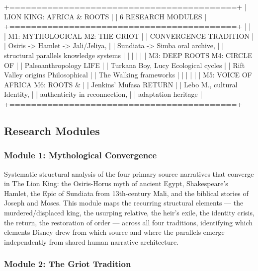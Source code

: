 \documentclass[11pt,letterpaper]{article}
\begin{document}
\begin{asciibox}
  +==========================================+
  |         LION KING: AFRICA & ROOTS        |
  |          6 RESEARCH MODULES              |
  +==========================================+
  |                                          |
  |  M1: MYTHOLOGICAL     M2: THE GRIOT     |
  |      CONVERGENCE          TRADITION      |
  |  Osiris -> Hamlet ->  Jali/Jeliya,       |
  |  Sundiata -> Simba    oral archive,      |
  |  structural parallels knowledge systems  |
  |         |                   |            |
  |  M3: DEEP ROOTS       M4: CIRCLE OF     |
  |  Paleoanthropology        LIFE           |
  |  Turkana Boy, Lucy    Ecological cycles  |
  |  Rift Valley origins  Philosophical      |
  |  The Walking          frameworks         |
  |         |                   |            |
  |  M5: VOICE OF AFRICA  M6: ROOTS &       |
  |  Jenkins' Mufasa          RETURN         |
  |  Lebo M., cultural    Identity,          |
  |  authenticity in       reconnection,     |
  |  adaptation            heritage          |
  +==========================================+
\end{asciibox}

\subsection{Research Modules}

\subsubsection{Module 1: Mythological Convergence}

Systematic structural analysis of the four primary source narratives that converge in The Lion King: the Osiris-Horus myth of ancient Egypt, Shakespeare's Hamlet, the Epic of Sundiata from 13th-century Mali, and the biblical stories of Joseph and Moses. This module maps the recurring structural elements --- the murdered/displaced king, the usurping relative, the heir's exile, the identity crisis, the return, the restoration of order --- across all four traditions, identifying which elements Disney drew from which source and where the parallels emerge independently from shared human narrative architecture.

\subsubsection{Module 2: The Griot Tradition}
\end{document}
